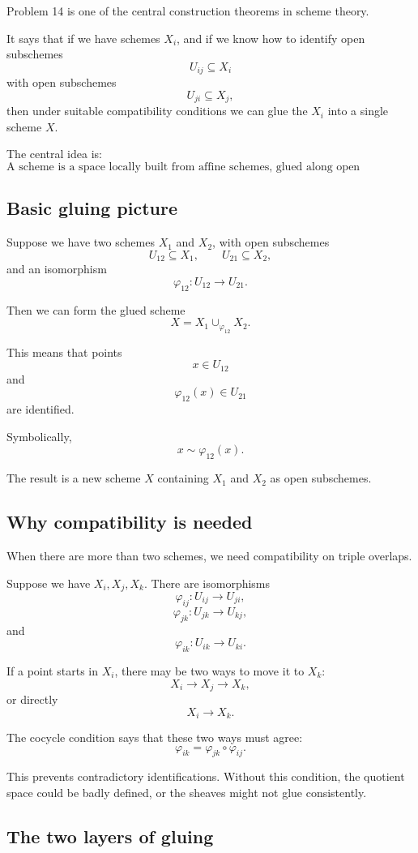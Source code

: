 \documentclass[12pt,a4paper]{article}
\theoremstyle{notespace}
\begin{document}
Problem 14 is one of the central construction theorems in scheme theory.

It says that if we have schemes \(X_i\), and if we know how to identify open subschemes
\[
U_{ij}\subseteq X_i
\]
with open subschemes
\[
U_{ji}\subseteq X_j,
\]
then under suitable compatibility conditions we can glue the \(X_i\) into a single scheme \(X\).

The central idea is:
\[
\boxed{
	\text{A scheme is a space locally built from affine schemes, glued along open subschemes.}
}
\]

\subsection{Basic gluing picture}

Suppose we have two schemes \(X_1\) and \(X_2\), with open subschemes
\[
U_{12}\subseteq X_1,
\qquad
U_{21}\subseteq X_2,
\]
and an isomorphism
\[
\varphi_{12}:U_{12}\to U_{21}.
\]

Then we can form the glued scheme
\[
X=X_1\cup_{\varphi_{12}}X_2.
\]

This means that points
\[
x\in U_{12}
\]
and
\[
\varphi_{12}(x)\in U_{21}
\]
are identified.

Symbolically,
\[
x\sim\varphi_{12}(x).
\]

The result is a new scheme \(X\) containing \(X_1\) and \(X_2\) as open subschemes.

\subsection{Why compatibility is needed}

When there are more than two schemes, we need compatibility on triple overlaps.

Suppose we have \(X_i,X_j,X_k\). There are isomorphisms
\[
\varphi_{ij}:U_{ij}\to U_{ji},
\]
\[
\varphi_{jk}:U_{jk}\to U_{kj},
\]
and
\[
\varphi_{ik}:U_{ik}\to U_{ki}.
\]

If a point starts in \(X_i\), there may be two ways to move it to \(X_k\):
\[
X_i\to X_j\to X_k,
\]
or directly
\[
X_i\to X_k.
\]

The cocycle condition says that these two ways must agree:
\[
\varphi_{ik}
=
\varphi_{jk}\circ\varphi_{ij}.
\]

This prevents contradictory identifications. Without this condition, the quotient space could be badly defined, or the sheaves might not glue consistently.

\subsection{The two layers of gluing}
\end{document}
